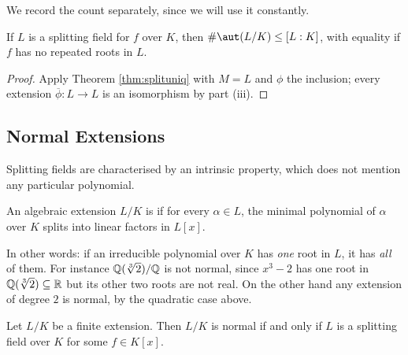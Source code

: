 \documentclass[a4paper]{scrartcl}
\begin{document}
We record the count separately, since we will use it constantly.

\begin{corollary}\label{cor:countaut}
	If $L$ is a splitting field for $f$ over $K$, then $\#\aut(L/K) \leq [L:K]$, with equality if $f$ has no repeated roots in $L$.
\end{corollary}

\begin{proof}
	Apply Theorem \ref{thm:splituniq} with $M = L$ and $\phi$ the inclusion; every extension $\overline\phi : L \to L$ is an isomorphism by part (iii).
\end{proof}

\subsection{Normal Extensions}

Splitting fields are characterised by an intrinsic property, which does not mention any particular polynomial.

\begin{definition}
	An algebraic extension $L/K$ is  if for every $\alpha \in L$, the minimal polynomial of $\alpha$ over $K$ splits into linear factors in $L[x]$.
\end{definition}

In other words: if an irreducible polynomial over $K$ has \emph{one} root in $L$, it has \emph{all} of them. For instance $\mathbb{Q}(\sqrt[3]2)/\mathbb{Q}$ is not normal, since $x^3-2$ has one root in $\mathbb{Q}(\sqrt[3]2) \subseteq \mathbb{R}$ but its other two roots are not real. On the other hand any extension of degree $2$ is normal, by the quadratic case above.

\begin{theorem}\label{thm:normalsplit}
	Let $L/K$ be a finite extension. Then $L/K$ is normal if and only if $L$ is a splitting field over $K$ for some $f \in K[x]$.
\end{theorem}
\end{document}
